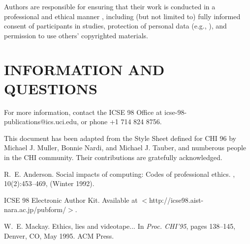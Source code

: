 Authors are responsible for ensuring that their work is 
conducted in a professional and ethical manner \cite{Anderson:Impacts}, 
including (but not limited to) fully informed consent of 
participants in studies, protection of personal data 
(e.g., \cite{Mackay:Ethics}), 
and permission to use others' copyrighted materials.

\section{INFORMATION AND QUESTIONS}

For more information, contact the ICSE 98 Office at 
icse-98-publications@ics.uci.edu, or phone +1 714 824 8756.

\acknowledgements

This document has been adapted from the Style Sheet 
defined for CHI 96 by Michael J. Muller, Bonnie Nardi, and 
Michael J. Tauber, and numberous people in the CHI 
community. Their contributions are gratefully acknowledged.



\begin{thebibliography}{1}

R.~E. Anderson.
\newblock Social impacts of computing: {C}odes of professional ethics.
, 10(2):453--469, (Winter 1992).

ICSE 98 {E}lectronic {A}uthor {K}it. {A}vailable at
  $<$http://icse98.aist-nara.ac.jp/pubform/$>$.

W.~E. Mackay.
\newblock Ethics, lies and videotape...
\newblock In {\em Proc. CHI'95}, pages 138--145, Denver, CO, May 1995. ACM
  Press.

\end{thebibliography}

